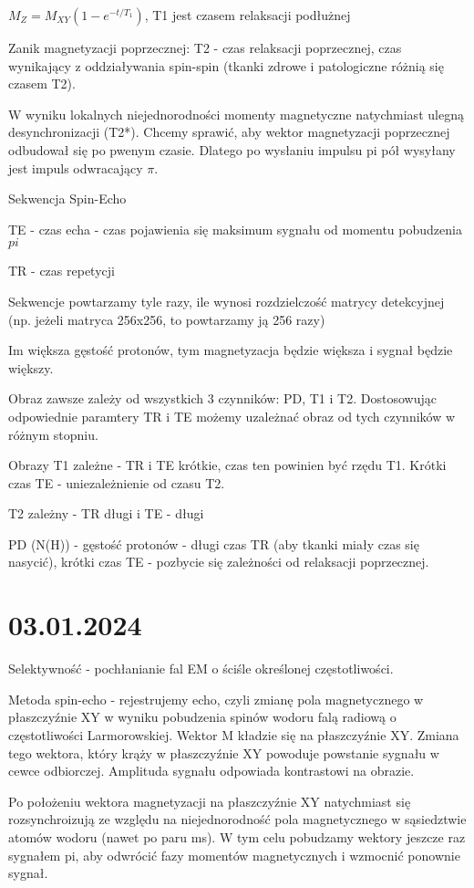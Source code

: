 \documentclass{article}
\begin{document}
$M_Z = M_{XY}(1-e^{-t/T_1})$, T1 jest czasem relaksacji podłużnej

Zanik magnetyzacji poprzecznej: T2 - czas relaksacji poprzecznej, czas wynikający z oddziaływania spin-spin (tkanki zdrowe i patologiczne różnią się czasem T2).

W wyniku lokalnych niejednorodności momenty magnetyczne natychmiast ulegną desynchronizacji (T2*). Chcemy sprawić, aby wektor magnetyzacji poprzecznej odbudował się po pwenym czasie. Dlatego po wysłaniu impulsu pi pół wysyłany jest impuls odwracający $\pi$.

Sekwencja Spin-Echo

TE - czas echa - czas pojawienia się maksimum sygnału od momentu pobudzenia $pi$

TR - czas repetycji

Sekwencje powtarzamy tyle razy, ile wynosi rozdzielczość matrycy detekcyjnej (np. jeżeli matryca 256x256, to powtarzamy ją 256 razy)

Im większa gęstość protonów, tym magnetyzacja będzie większa i sygnał będzie większy.

Obraz zawsze zależy od wszystkich 3 czynników: PD, T1 i T2. Dostosowując odpowiednie paramtery TR i TE możemy uzależnać obraz od tych czynników w różnym stopniu.

Obrazy T1 zależne - TR i TE krótkie, czas ten powinien być rzędu T1. Krótki czas TE - uniezależnienie od czasu T2.

T2 zależny - TR długi i TE - długi

PD (N(H)) - gęstość protonów - długi czas TR (aby tkanki miały czas się nasycić), krótki czas TE - pozbycie się zależności od relaksacji poprzecznej.

\section{03.01.2024}

Selektywność - pochłanianie fal EM o ściśle określonej częstotliwości.

Metoda spin-echo - rejestrujemy echo, czyli zmianę pola magnetycznego w płaszczyźnie XY w wyniku pobudzenia spinów wodoru falą radiową o częstotliwości Larmorowskiej. Wektor M kładzie się na płaszczyźnie XY. Zmiana tego wektora, który krąży w płaszczyźnie XY powoduje powstanie sygnału w cewce odbiorczej. Amplituda sygnału odpowiada kontrastowi na obrazie.

Po położeniu wektora magnetyzacji na płaszczyźnie XY natychmiast się rozsynchroizują ze względu na niejednorodność pola magnetycznego w sąsiedztwie atomów wodoru (nawet po paru ms). W tym celu pobudzamy wektory jeszcze raz sygnałem pi, aby odwrócić fazy momentów magnetycznych i wzmocnić ponownie sygnał.
\end{document}

